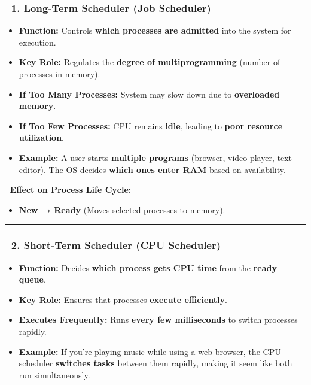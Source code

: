 \documentclass[
]{article}
\providecommand{\tightlist}{%
  \setlength{\itemsep}{0pt}\setlength{\parskip}{0pt}}
\begin{document}
\subsubsection{\texorpdfstring{\textbf{📍 1. Long-Term Scheduler (Job
Scheduler)}}{📍 1. Long-Term Scheduler (Job Scheduler)}}\label{long-term-scheduler-job-scheduler}

\begin{itemize}
\tightlist
\item
  \textbf{Function:} Controls \textbf{which processes are admitted} into
  the system for execution.
\item
  \textbf{Key Role:} Regulates the \textbf{degree of multiprogramming}
  (number of processes in memory).
\item
  \textbf{If Too Many Processes:} System may slow down due to
  \textbf{overloaded memory}.
\item
  \textbf{If Too Few Processes:} CPU remains \textbf{idle}, leading to
  \textbf{poor resource utilization}.
\item
  \textbf{Example:} A user starts \textbf{multiple programs} (browser,
  video player, text editor). The OS decides \textbf{which ones enter
  RAM} based on availability.
\end{itemize}

📌 \textbf{Effect on Process Life Cycle:}

\begin{itemize}
\tightlist
\item
  \textbf{New → Ready} (Moves selected processes to memory).
\end{itemize}

\begin{center}\rule{0.5\linewidth}{0.5pt}\end{center}

\subsubsection{\texorpdfstring{\textbf{📍 2. Short-Term Scheduler (CPU
Scheduler)}}{📍 2. Short-Term Scheduler (CPU Scheduler)}}\label{short-term-scheduler-cpu-scheduler}

\begin{itemize}
\tightlist
\item
  \textbf{Function:} Decides \textbf{which process gets CPU time} from
  the \textbf{ready queue}.
\item
  \textbf{Key Role:} Ensures that processes \textbf{execute
  efficiently}.
\item
  \textbf{Executes Frequently:} Runs \textbf{every few milliseconds} to
  switch processes rapidly.
\item
  \textbf{Example:} If you're playing music while using a web browser,
  the CPU scheduler \textbf{switches tasks} between them rapidly, making
  it seem like both run simultaneously.
\end{itemize}
\end{document}
